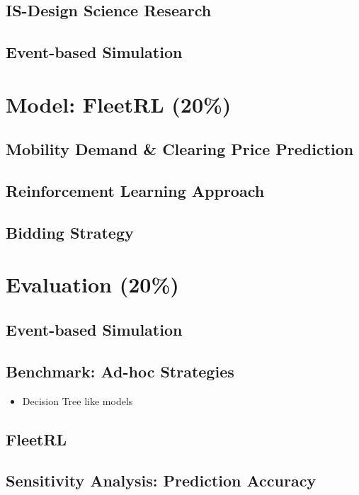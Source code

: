 \documentclass[12pt, article]{article}
\begin{document}
\subsection{IS-Design Science Research}
\label{sec:orgca72d31}
\subsection{Event-based Simulation}
\label{sec:org86b589a}

\section{Model: FleetRL (20\%)}
\label{sec:orga065f9d}
\subsection{Mobility Demand \& Clearing Price Prediction}
\label{sec:org6a96b59}
\subsection{Reinforcement Learning Approach}
\label{sec:orgf7ba4f2}
\subsection{Bidding Strategy}
\label{sec:org2909839}

\section{Evaluation (20\%)}
\label{sec:org1d1d0a4}
\subsection{Event-based Simulation}
\label{sec:org66e9672}
\subsection{Benchmark: Ad-hoc Strategies}
\label{sec:org8130c51}
\begin{itemize}
\item Decision Tree like models
\end{itemize}
\subsection{FleetRL}
\label{sec:orgde7ef6b}
\subsection{Sensitivity Analysis: Prediction Accuracy}
\label{sec:orgd2e063b}
\end{document}

